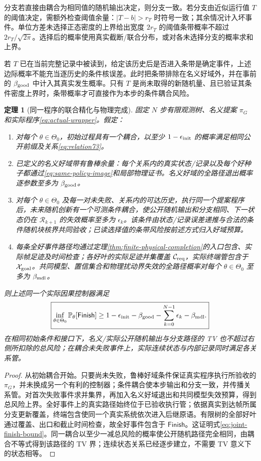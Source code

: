 \documentclass[UTF8,fontset=fandol,zihao=5,a4paper]{ctexart}
\newtheorem{theorem}{定理}[section]
\theoremstyle{definition}
\theoremstyle{remark}\newtheorem{remark}[theorem]{说明}
\numberwithin{equation}{section}
\begin{document}
分支若直接由耦合为相同值的随机输出决定，则分支一致。若分支由近似运行值 $T$ 的阈值决定，需额外检查阈值余量：$|T-b|>r_T$ 时符号一致；其余情况计入坏事件。单位方差未选择正态密度的上界给出宽度 $2r_T$ 的阈值条带概率不超过 $2r_T/\sqrt{2\pi}$。选择后的概率使用真实截断/联合分布，或对各未选择分支的概率求和上界。

若 $T$ 已在当前完整记录中被读到，给定该历史后是否进入条带是确定事件，上述边际概率不能充当逐历史的条件核误差。此时把条带排除在名义好域外，并在事前的 $\beta_{\rm good}$ 中计入其真实发生概率。只有 $T$ 是尚未取得的新随机量、且已验证其条件密度上界时，条带概率才可直接作为本步的条件耦合风险。

\begin{theorem}[同一程序的联合精化与物理完成]
\label{thm:joint-physical-finish}
固定 $N$ 步有限观测树、名义提案 $\pi_G$ 和实际程序\eqref{eq:actual-wrapper}。假定：
\begin{enumerate}
\item 对每个 $\theta\in\Theta_0$，初始过程具有一个耦合，以至少 $1-\epsilon_{\rm init}$ 的概率满足相同公开前缀及关系\eqref{eq:relation73}。
\item 已定义的名义好域带有鲁棒余量：每个关系内的真实状态/记录以及每个好种子都通过\eqref{eq:same-policy-image}和局部物理证书。名义好域的全路径退出概率逐参数至多为 $\beta_{\rm good}$。
\item 对每个 $\theta\in\Theta_0$ 及每一对未失败、关系内的可达历史，执行同一个提案程序后，未来随机创新有一个可测条件耦合，使公开随机输出和分支相同、下一状态仍在 $\mathscr R_{k+1}$ 的失效概率至多为 $\epsilon_k$。该条件由状态/记录误差递推与合法的条件随机块核界共同验收；已读选择值的条带风险按前述方式归入好域预算。
\item 每条全好事件路径均通过定理\ref{thm:finite-physical-completion}的入口包含、实际帧足迹及时间检查；各好叶的实际足迹并集覆盖 $\mathcal C_{\rm req}$，实际终端管包含于 $\mathcal X_{\rm goal}$。共同模型、置信集合和物理扰动界失效的全路径概率对每个 $\theta\in\Theta_0$ 至多为 $\beta_{\rm mdl}$。
\end{enumerate}
则上述\emph{同一个}实际因果控制器满足
\begin{equation}
\boxed{\inf_{\theta\in\Theta_0}\mathbb P_\theta[\mathsf{Finish}]
\ge1-\epsilon_{\rm init}-\beta_{\rm good}
-\sum_{k=0}^{N-1}\epsilon_k-\beta_{\rm mdl}.}
\label{eq:joint-finish-bound}
\end{equation}
在相同初始条件和接口下，名义/实际公开随机输出与分支路径的 TV 也不超过右侧所扣除的总风险；在耦合未失败事件上，实际连续状态与内部记录同时满足各关系管。
\end{theorem}
\begin{proof}
从初始耦合开始。只要尚未失败，鲁棒好域条件保证真实程序执行所验收的 $\pi_G$，并未换成另一个有利的控制器；条件耦合使本步输出和分支一致，并传播关系管。对首次失败事件求并集界，再加入名义好域退出和共同模型失效预算，得到总风险上界。全好事件上的真实路径始终位于已验收执行管；依据真实到达帧所属分支更新覆盖，终端包含使同一个真实系统依次进入后继原语。有限树的全部好叶通过覆盖、出口和截止时间检查，故全好事件包含于 $\mathsf{Finish}$。这证明式\eqref{eq:joint-finish-bound}。同一耦合以至少一减总风险的概率使公开随机路径完全相同，由耦合不等式得到该路径的 TV 界；连续状态关系已经逐步建立，不需要 TV 意义下的状态相等。
\end{proof}
\end{document}
